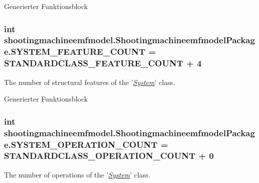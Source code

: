 Generierter Funktionsblock  \hypertarget{interfaceshootingmachineemfmodel_1_1_shootingmachineemfmodel_package_ad4a56d0fa7fcef2ee12468cd8a826a2b}{
\subsubsection[{S\-Y\-S\-T\-E\-M\-\_\-\-F\-E\-A\-T\-U\-R\-E\-\_\-\-C\-O\-U\-N\-T}]{\setlength{\rightskip}{0pt plus 5cm}int shootingmachineemfmodel.\-Shootingmachineemfmodel\-Package.\-S\-Y\-S\-T\-E\-M\-\_\-\-F\-E\-A\-T\-U\-R\-E\-\_\-\-C\-O\-U\-N\-T = {\bf S\-T\-A\-N\-D\-A\-R\-D\-C\-L\-A\-S\-S\-\_\-\-F\-E\-A\-T\-U\-R\-E\-\_\-\-C\-O\-U\-N\-T} + 4}}\label{interfaceshootingmachineemfmodel_1_1_shootingmachineemfmodel_package_ad4a56d0fa7fcef2ee12468cd8a826a2b}
The number of structural features of the '{\itshape \hyperlink{interfaceshootingmachineemfmodel_1_1_system}{System}}' class.

Generierter Funktionsblock  \hypertarget{interfaceshootingmachineemfmodel_1_1_shootingmachineemfmodel_package_a5a7a589e56d52ab3dc86b3585b6230bf}{
\subsubsection[{S\-Y\-S\-T\-E\-M\-\_\-\-O\-P\-E\-R\-A\-T\-I\-O\-N\-\_\-\-C\-O\-U\-N\-T}]{\setlength{\rightskip}{0pt plus 5cm}int shootingmachineemfmodel.\-Shootingmachineemfmodel\-Package.\-S\-Y\-S\-T\-E\-M\-\_\-\-O\-P\-E\-R\-A\-T\-I\-O\-N\-\_\-\-C\-O\-U\-N\-T = {\bf S\-T\-A\-N\-D\-A\-R\-D\-C\-L\-A\-S\-S\-\_\-\-O\-P\-E\-R\-A\-T\-I\-O\-N\-\_\-\-C\-O\-U\-N\-T} + 0}}\label{interfaceshootingmachineemfmodel_1_1_shootingmachineemfmodel_package_a5a7a589e56d52ab3dc86b3585b6230bf}
The number of operations of the '{\itshape \hyperlink{interfaceshootingmachineemfmodel_1_1_system}{System}}' class.

